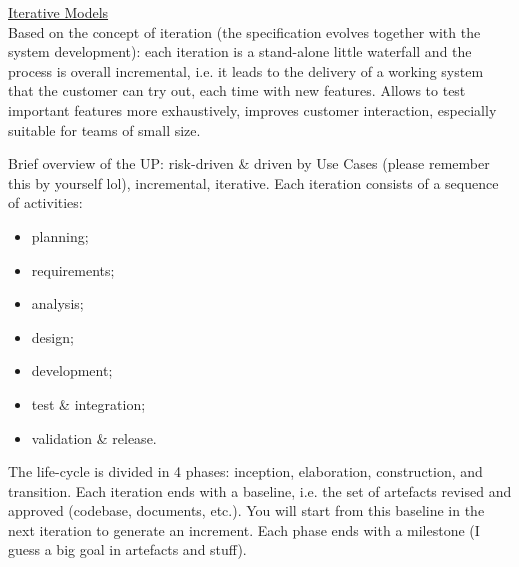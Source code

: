 \noindent \underline{Iterative Models}\\
\noindent Based on the concept of iteration (the specification evolves together with the system development): each iteration is a stand-alone little waterfall and the process is overall incremental, i.e. it leads to the delivery of a working system that the customer can try out, each time with new features. Allows to test important features more exhaustively, improves customer interaction, especially suitable for teams of small size.

 Brief overview of the UP: risk-driven \& driven by Use Cases (please remember this by yourself lol), incremental, iterative. Each iteration consists of a sequence of activities:
 \begin{itemize}
     \item planning;
     \item requirements;
     \item analysis;
     \item design;
     \item development;
     \item test \& integration;
     \item validation \& release.
 \end{itemize}
The life-cycle is divided in 4 phases: inception, elaboration, construction, and transition. Each iteration ends with a baseline, i.e. the set of artefacts revised and approved (codebase, documents, etc.). You will start from this baseline in the next iteration to generate an increment. Each phase ends with a milestone (I guess a big goal in artefacts and stuff).

 